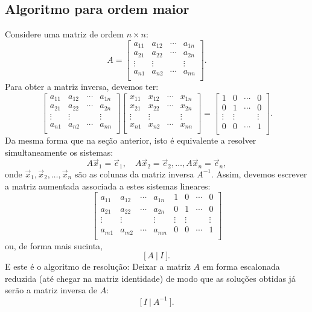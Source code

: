 \documentclass[../livro.tex]{subfiles}  %
\begin{document}
\subsection{Algoritmo para ordem maior}\label{scn:alg-ordem-maior}

Considere uma matriz de ordem $n \times n$:
\[
A =
\left[
\begin{array}{cccc}
a_{11} & a_{12} & \cdots & a_{1n} \\
a_{21} & a_{22} & \cdots & a_{2n} \\
\vdots & \vdots &        & \vdots \\
a_{n1} & a_{n2} & \cdots & a_{nn} \\
\end{array}
\right].
\] Para obter a matriz inversa, devemos ter:
\[
\left[
\begin{array}{cccc}
a_{11} & a_{12} & \cdots & a_{1n} \\
a_{21} & a_{22} & \cdots & a_{2n} \\
\vdots & \vdots &        & \vdots \\
a_{n1} & a_{n2} & \cdots & a_{nn} \\
\end{array}
\right]
\left[
\begin{array}{cccc}
x_{11} & x_{12} & \cdots & x_{1n} \\
x_{21} & x_{22} & \cdots & x_{2n} \\
\vdots & \vdots &        & \vdots \\
x_{n1} & x_{n2} & \cdots & x_{nn} \\
\end{array}
\right]
=
\left[
\begin{array}{cccc}
1   &    0   & \cdots &    0   \\
0   &    1   & \cdots &    0   \\
\vdots & \vdots &        & \vdots \\
0   &    0   & \cdots &    1   \\
\end{array}
\right].
\] Da mesma forma que na seção anterior, isto é equivalente a resolver simultaneamente os sistemas:
\[
A \vec{x}_1 = \vec{e}_1, \quad A \vec{x}_2 = \vec{e}_2, \dots, A \vec{x}_n = \vec{e}_n,
\] onde $\vec{x}_1, \vec{x}_2, \dots, \vec{x}_n$ são as colunas da matriz inversa $A^{-1}$. Assim, devemos escrever a matriz aumentada associada a estes sistemas lineares:
\[
\left[
\begin{array}{cccc|cccc}
a_{11} & a_{12} & \cdots & a_{1n} &   1   &    0   & \cdots &    0 \\
a_{21} & a_{22} & \cdots & a_{2n} &   0   &    1   & \cdots &    0\\
\vdots & \vdots &        & \vdots &   \vdots & \vdots &        & \vdots  \\
a_{m1} & a_{m2} & \cdots & a_{mn} &   0   &    0   & \cdots &    1\\
\end{array}
\right]
\] ou, de forma mais sucinta,
\[
\big[ \, A \ | \ I \ \big].
\] E este é o algoritmo de resolução: Deixar a matriz $A$ em forma escalonada reduzida (até chegar na matriz identidade) de modo que as soluções obtidas já serão a matriz inversa de $A$:
\[
\big[ \, I \ | \ A^{-1} \ \big].
\]
\end{document}

